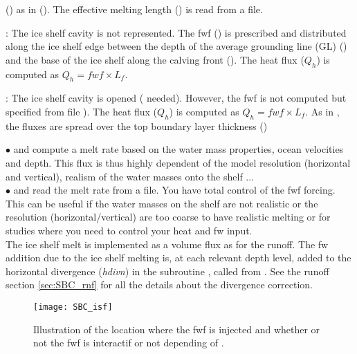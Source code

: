 \documentclass[../main/NEMO_manual]{subfiles}
\begin{document}
\begin{description}
  () as in ().
  The effective melting length () is read from a file.
\item [{\np[=3]{nn_isf}{nn\_isf}}]: The ice shelf cavity is not represented.
  The fwf () is prescribed and distributed along the ice shelf edge between
  the depth of the average grounding line (GL) () and
  the base of the ice shelf along the calving front ().
  The heat flux ($Q_h$) is computed as $Q_h = fwf \times L_f$.
\item [{\np[=4]{nn_isf}{nn\_isf}}]: The ice shelf cavity is opened ( needed).
  However, the fwf is not computed but specified from file ).
  The heat flux ($Q_h$) is computed as $Q_h = fwf \times L_f$.
  As in , the fluxes are spread over the top boundary layer thickness ()
\end{description}

$\bullet$  and  compute a melt rate based on
the water mass properties, ocean velocities and depth.
This flux is thus highly dependent of the model resolution (horizontal and vertical),
realism of the water masses onto the shelf ...\\

$\bullet$  and  read the melt rate from a file.
You have total control of the fwf forcing.
This can be useful if the water masses on the shelf are not realistic or
the resolution (horizontal/vertical) are too coarse to have realistic melting or
for studies where you need to control your heat and fw input.\\

The ice shelf melt is implemented as a volume flux as for the runoff.
The fw addition due to the ice shelf melting is, at each relevant depth level, added to
the horizontal divergence (\textit{hdivn}) in the subroutine , called from .
See the runoff section \autoref{sec:SBC_rnf} for all the details about the divergence correction.\\

\begin{figure}[!t]
  \centering
  \texttt{[image: SBC\_isf]}
  \caption[Ice shelf location and fresh water flux definition]{
    Illustration of the location where the fwf is injected and
    whether or not the fwf is interactif or not depending of \protect{}.}
  \label{fig:SBC_isf}
\end{figure}
\end{document}
